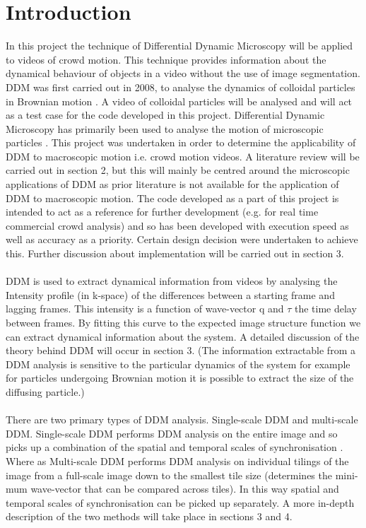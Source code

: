 \documentclass[11pt]{article}
\begin{document}
\section{Introduction}
In this project the technique of Differential Dynamic Microscopy will be applied to videos of crowd motion. This technique provides information about the dynamical behaviour of objects in a video without the use of image segmentation. DDM was first carried out in 2008, to analyse the dynamics of colloidal particles in Brownian motion \cite{ddm0}. A video of colloidal particles will be analysed and will act as a test case for the code developed in this project. Differential Dynamic Microscopy has primarily been used to analyse the motion of microscopic particles \cite{ddm1} \cite{ddm2}. This project was undertaken in order to determine the applicability of DDM to macroscopic motion i.e. crowd motion videos. A literature review will be carried out in section 2, but this will mainly be centred around the microscopic applications of DDM as prior literature is not available for the application of DDM to macroscopic motion. The code developed as a part of this project is intended to act as a reference for further development (e.g. for real time commercial crowd analysis) and so has been developed with execution speed as well as accuracy as a priority. Certain design decision were undertaken to achieve this. Further discussion about implementation will be carried out in section 3.
\\\\
DDM is used to extract dynamical information from videos by analysing the Intensity profile (in k-space) of the differences between a starting frame and lagging frames. This intensity is a function of wave-vector q and $\tau$ the time delay between frames. By fitting this curve to the expected image structure function we can extract dynamical information about the system. A detailed discussion of the theory behind DDM will occur in section 3. (The information extractable from a DDM analysis is sensitive to the particular dynamics of the system for example for particles undergoing Brownian motion it is possible to extract the size of the diffusing particle\cite{ddm1}.)
\\\\
There are two primary types of DDM analysis. Single-scale DDM and multi-scale DDM. Single-scale DDM performs DDM analysis on the entire image and so picks up a combination of the spatial and temporal scales of synchronisation \cite{ddm2}. Where as Multi-scale DDM performs DDM analysis on individual tilings of the image from a full-scale image down to the smallest tile size (determines the mini-mum wave-vector that can be compared across tiles)\cite{ddm2}. In this way spatial and temporal scales of synchronisation can be picked up separately. A more in-depth description of the two methods will take place in sections 3 and 4.  
\end{document}
